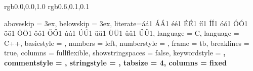 \definecolor{vsblue} {rgb}{0.0,0.0,1.0} %
\definecolor{vsred}  {rgb}{0.6,0.1,0.1} %

\lstset
{	
	aboveskip = 3ex,
	belowskip = 3ex,
	literate={á}{{\'a}}1
			 {Á}{{\'A}}1
			 {é}{{\'e}}1
			 {É}{{\'E}}1
			 {í}{{\'i}}1
			 {Í}{{\'I}}1
			 {ó}{{\'o}}1
			 {Ó}{{\'O}}1
			 {ö}{{\"o}}1
			 {Ö}{{\"O}}1
			 {ő}{{\H{o}}}1
			 {Ő}{{\H{O}}}1
			 {ú}{{\'u}}1
			 {Ú}{{\'U}}1
			 {ü}{{\"u}}1
			 {Ü}{{\"U}}1
			 {ű}{{\H{u}}}1
			 {Ű}{{\H{U}}}1,
	language = C,
	language = C++,
	basicstyle = \small \ttfamily,
	numbers = left,
	numberstyle = \tiny,
	frame = tb,
	breaklines = true,
	columns = fullflexible,
	showstringspaces = false,
	keywordstyle = \color{vsblue} \bfseries,
	commentstyle = \color{vsgreen},
	stringstyle = \color{vsred},
	tabsize = 4,
	columns = fixed
}
